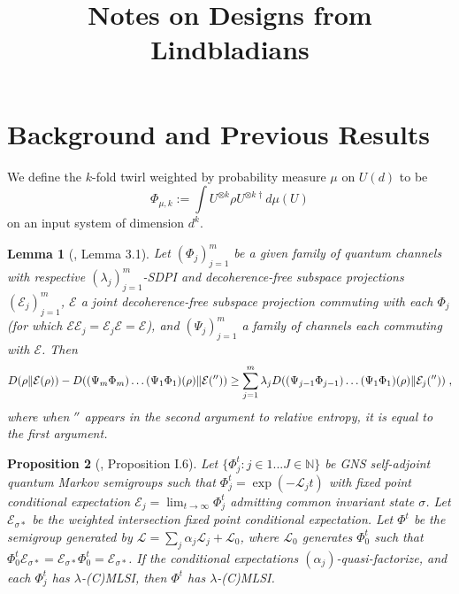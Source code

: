 \documentclass[11pt,reqno]{amsart}
\title{Notes on Designs from Lindbladians}
\newtheorem{lemma}{Lemma}[section]
\newtheorem{prop}[lemma]{Proposition}
\newcommand{\NN}{\mathbb{N}}
\newcommand{\E}{\mathcal{E}}
\newcommand{\pl}{\hspace{.1cm}}
\renewcommand{\L}{\mathcal{L}}
\newcommand{\mbalign}{}
\newcommand{\mbnline}{}
\begin{document}
\section{Background and Previous Results}
We define the $k$-fold twirl weighted by probability measure $\mu$ on $U(d)$ to be
\begin{equation}
    \Phi_{\mu, k} := \int U^{\otimes k} \rho U^{\otimes k \dagger} d \mu(U)
\end{equation}
on an input system of dimension $d^k$.
\begin{lemma}[\cite{laracuente_quantum_2025}, Lemma 3.1] \label{lem:chainmin1}
Let $(\Phi_j)_{j=1}^m$ be a given family of quantum channels with respective $(\lambda_j)_{j=1}^m$-SDPI and decoherence-free subspace projections $(\E_j)_{j=1}^m$, $\E$ a joint decoherence-free subspace projection commuting with each $\Phi_j$ (for which $\E \E_j = \E_j \E = \E$),
and $(\Psi_j)_{j=1}^m$ a family of channels each commuting with $\E$. Then
\begin{equation*}
    \begin{split}
         D(\rho \| \E(\rho)) - D((\Psi_m \Phi_m) \dots (\Psi_1 \Phi_1) (\rho) \| \E (''))
            \mbnline \mbalign \geq \sum_{j=1}^m \lambda_j D( (\Psi_{j-1} \Phi_{j-1}) \dots (\Psi_1 \Phi_1)(\rho) \| \E_j ('')) \pl,
    \end{split}
\end{equation*}
where when $''$ appears in the second argument to relative entropy, it is equal to the first argument.
\end{lemma}
\begin{prop}[\cite{laracuente_quasi-factorization_2022}, Proposition I.6] \label{prop:decay-merge}
Let $\{\Phi^t_j : j \in 1...J \in \NN\}$ be GNS self-adjoint quantum Markov semigroups such that $\Phi_j^t = \exp(- \L_j t)$ with fixed point conditional expectation $\E_{j} = \lim_{t \rightarrow \infty} \Phi_j^t$ admitting common invariant state $\sigma$. Let $\E_{\sigma *}$ be the weighted intersection fixed point conditional expectation. Let $\Phi^t$ be the semigroup generated by $\L = \sum_j \alpha_j \L_j + \L_0$, where $\L_0$ generates $\Phi_0^t$ such that $\Phi_0^t \E_{\sigma *} = \E_{\sigma *} \Phi_0^t = \E_{\sigma *}$. If the conditional expectations $(\alpha_j)$-quasi-factorize, and each $\Phi^t_j$ has $\lambda$-(C)MLSI, then $\Phi^t$ has $\lambda$-(C)MLSI.
\end{prop}
\end{document}
